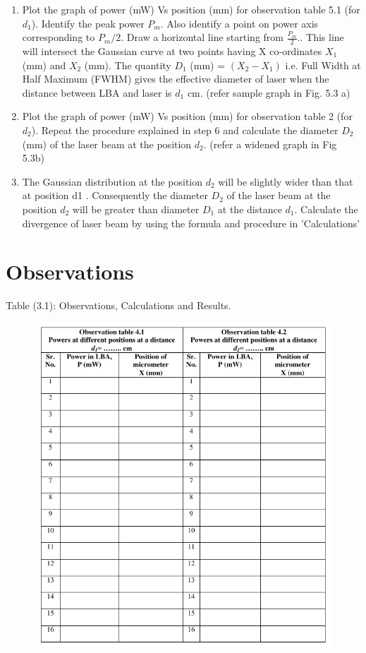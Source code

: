 \documentclass[11pt]{article}
\begin{document}
\begin{enumerate}
\item Plot the graph of power (mW) Vs position (mm) for observation table 5.1 (for \(d_1\)).
Identify the peak power \(P_m\). Also identify a point on power axis corresponding to \(P_m/2\).
Draw a horizontal line starting from \(\frac{P_m}{2}\).. This line will intersect the Gaussian curve at
two points having X co-ordinates $X_1$ (mm) and $X_2$ (mm). The quantity $D_1$ (mm) = $(X_2 - X_1)$
i.e. Full Width at Half Maximum (FWHM) gives the effective diameter of laser when the
distance between LBA and laser is $d_1$ cm. (refer sample graph in Fig. 5.3 a)

\item Plot the graph of power (mW) Vs position (mm) for observation table 2 (for  $d_2$). Repeat
the procedure explained in step 6 and calculate the diameter  $D_2$ (mm) of the laser beam at
the position  $d_2$. (refer a widened graph in Fig 5.3b)

\item The Gaussian distribution at the position $d_2$ will be slightly wider than that at position d1 .
Consequently the diameter  $D_2$ of the laser beam at the position $d_2$ will be greater than
diameter $D_1$ at the distance $d_1$. Calculate the divergence of laser beam by using the
formula and procedure in 'Calculations'

	\end{enumerate}
\clearpage

\section{Observations}

Table (3.1): Observations, Calculations and Results.

\begin{figure}[H]
	\centering
	\includegraphics[scale=0.9]{table.png}
	\label{it}
\end{figure}
\end{document}
